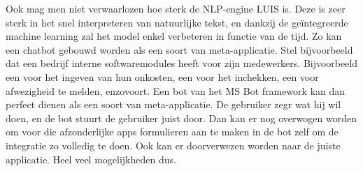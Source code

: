 Ook mag men niet verwaarlozen hoe sterk de NLP-engine LUIS is. Deze is zeer sterk in het snel interpreteren van natuurlijke tekst, en dankzij de geïntegreerde machine learning zal het model enkel verbeteren in functie van de tijd. Zo kan een chatbot gebouwd worden als een soort van meta-applicatie. Stel bijvoorbeeld dat een bedrijf interne softwaremodules heeft voor zijn medewerkers. Bijvoorbeeld een voor het ingeven van hun onkosten, een voor het inchekken, een voor afwezigheid te melden, enzovoort. Een bot van het MS Bot framework kan dan perfect dienen als een soort van meta-applicatie. De gebruiker zegr wat hij wil doen, en de bot stuurt de gebruiker juist door. Dan kan er nog overwogen worden om voor die afzonderlijke apps formulieren aan te maken in de bot zelf om de integratie zo volledig te doen. Ook kan er doorverwezen worden naar de juiste applicatie. Heel veel mogelijkheden dus. 







